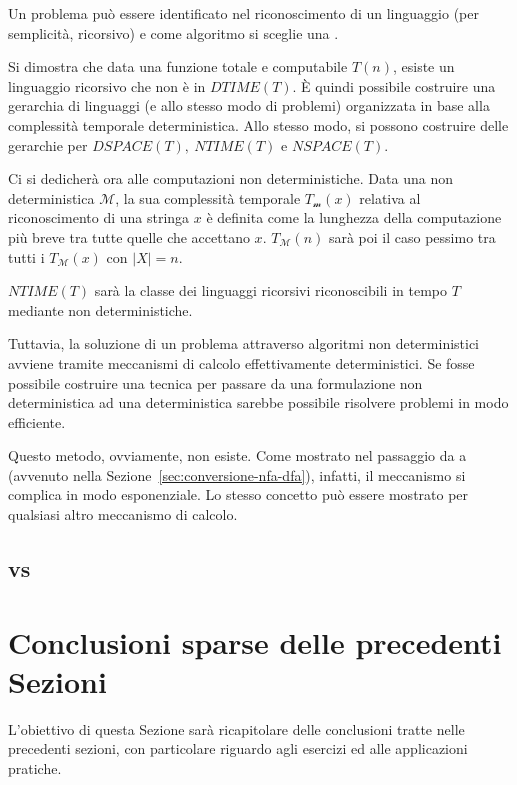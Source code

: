 \documentclass[italian, 10pt]{article}
\begin{document}
Un problema può essere identificato nel riconoscimento di un linguaggio (per semplicità, ricorsivo) e come algoritmo si sceglie una \TM.

\bigskip
Si dimostra che data una funzione totale e computabile \(T(n)\), esiste un linguaggio ricorsivo che non è in \(DTIME(T)\).
È quindi possibile costruire una gerarchia di linguaggi (e allo stesso modo di problemi) organizzata in base alla complessità temporale deterministica.
Allo stesso modo, si possono costruire delle gerarchie per \(DSPACE(T),\ NTIME(T)\) e \(NSPACE(T)\).

\bigskip
Ci si dedicherà ora alle computazioni non deterministiche.
Data una \TM non deterministica \(\mathcal{M}\), la sua complessità temporale \(T_{\mathcal{m}}(x)\) relativa al riconoscimento di una stringa \(x\) è definita come la lunghezza della computazione più breve tra tutte quelle che accettano \(x\).
\(T_{\mathcal{M}}(n)\) sarà poi il caso pessimo tra tutti i \(T_{\mathcal{M}}(x)\) con \(|X| = n\).

\(NTIME(T)\) sarà la classe dei linguaggi ricorsivi riconoscibili in tempo \(T\) mediante \TM non deterministiche.

Tuttavia, la soluzione di un problema attraverso algoritmi non deterministici avviene tramite meccanismi di calcolo effettivamente deterministici.
Se fosse possibile costruire una tecnica  per passare da una formulazione non deterministica ad una deterministica sarebbe possibile risolvere problemi  in modo efficiente.

Questo metodo, ovviamente, non esiste.
Come mostrato nel passaggio da \FSA a \NFA (avvenuto nella Sezione~\ref{sec:conversione-nfa-dfa}), infatti, il meccanismo si complica in modo esponenziale.
Lo stesso concetto può essere mostrato per qualsiasi altro meccanismo di calcolo.

\subsection[P vs NP]{\Pset vs \NPset}

\clearpage

\section{Conclusioni sparse delle precedenti Sezioni}

L'obiettivo di questa Sezione sarà ricapitolare delle conclusioni tratte nelle precedenti sezioni, con particolare riguardo agli esercizi ed alle applicazioni pratiche.
\end{document}
